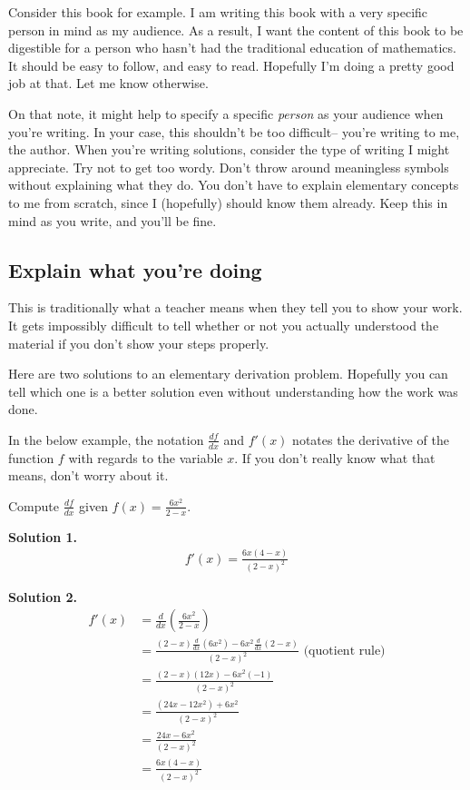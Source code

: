 Consider this book for example. I am writing this book with a very specific person in mind as my audience. As a result, I want the content of this book to be digestible for a person who hasn't had the traditional education of mathematics. It should be easy to follow, and easy to read. Hopefully I'm doing a pretty good job at that. Let me know otherwise.

On that note, it might help to specify a specific \textit{person} as your audience when you're writing. In your case, this shouldn't be too difficult-- you're writing to me, the author. When you're writing solutions, consider the type of writing I might appreciate. Try not to get too wordy. Don't throw around meaningless symbols without explaining what they do. You don't have to explain elementary concepts to me from scratch, since I (hopefully) should know them already. Keep this in mind as you write, and you'll be fine.

\subsection{Explain what you're doing}

This is traditionally what a teacher means when they tell you to show your work. It gets impossibly difficult to tell whether or not you actually understood the material if you don't show your steps properly. 

Here are two solutions to an elementary derivation problem. Hopefully you can tell which one is a better solution even without understanding how the work was done. 

In the below example, the notation $\frac{df}{dx}$ and $f'(x)$ notates the derivative of the function $f$ with regards to the variable $x$. If you don't really know what that means, don't worry about it.

\begin{example}
Compute $\frac{df}{dx}$ given $f(x) = \frac{6x^2}{2-x}$.
\end{example}

\textbf{Solution 1.}
\begin{align*}
    f'(x) = \frac{6x(4-x)}{(2-x)^2}
\end{align*}

\textbf{Solution 2.}
\begin{align*}
    f'(x) &= \frac{d}{dx}\left(\frac{6x^2}{2-x}\right)\\
        &= \frac{(2-x)\frac{d}{dx}(6x^2) - 6x^2\frac{d}{dx}(2-x)}{(2-x)^2} \text{ (quotient rule)}\\
        &= \frac{(2-x)(12x) - 6x^2(-1)}{(2-x)^2}\\
        &= \frac{(24x-12x^2) + 6x^2}{(2-x)^2}\\
        &= \frac{24x-6x^2}{(2-x)^2}\\
        &= \frac{6x(4-x)}{(2-x)^2}\\
\end{align*}

